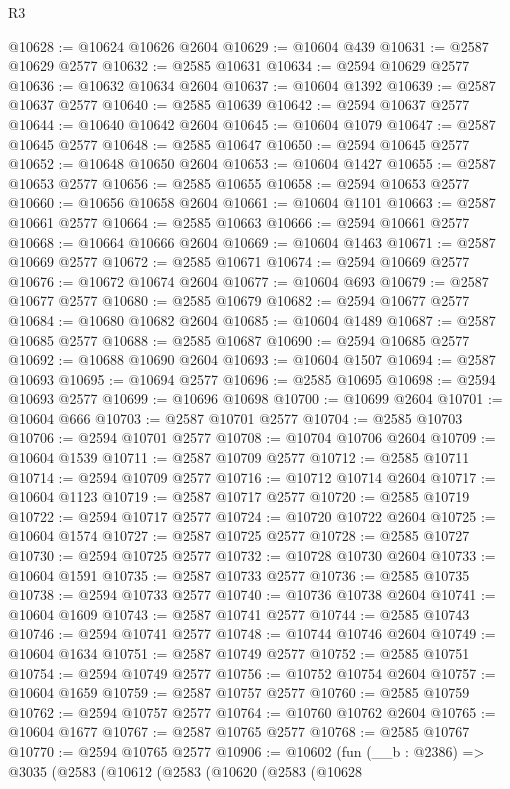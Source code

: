 \begin{lexlean}{R3}
\begin{coremodule}
@10628 := @10624 @10626 @2604
@10629 := @10604 @439
@10631 := @2587 @10629 @2577
@10632 := @2585 @10631
@10634 := @2594 @10629 @2577
@10636 := @10632 @10634 @2604
@10637 := @10604 @1392
@10639 := @2587 @10637 @2577
@10640 := @2585 @10639
@10642 := @2594 @10637 @2577
@10644 := @10640 @10642 @2604
@10645 := @10604 @1079
@10647 := @2587 @10645 @2577
@10648 := @2585 @10647
@10650 := @2594 @10645 @2577
@10652 := @10648 @10650 @2604
@10653 := @10604 @1427
@10655 := @2587 @10653 @2577
@10656 := @2585 @10655
@10658 := @2594 @10653 @2577
@10660 := @10656 @10658 @2604
@10661 := @10604 @1101
@10663 := @2587 @10661 @2577
@10664 := @2585 @10663
@10666 := @2594 @10661 @2577
@10668 := @10664 @10666 @2604
@10669 := @10604 @1463
@10671 := @2587 @10669 @2577
@10672 := @2585 @10671
@10674 := @2594 @10669 @2577
@10676 := @10672 @10674 @2604
@10677 := @10604 @693
@10679 := @2587 @10677 @2577
@10680 := @2585 @10679
@10682 := @2594 @10677 @2577
@10684 := @10680 @10682 @2604
@10685 := @10604 @1489
@10687 := @2587 @10685 @2577
@10688 := @2585 @10687
@10690 := @2594 @10685 @2577
@10692 := @10688 @10690 @2604
@10693 := @10604 @1507
@10694 := @2587 @10693
@10695 := @10694 @2577
@10696 := @2585 @10695
@10698 := @2594 @10693 @2577
@10699 := @10696 @10698
@10700 := @10699 @2604
@10701 := @10604 @666
@10703 := @2587 @10701 @2577
@10704 := @2585 @10703
@10706 := @2594 @10701 @2577
@10708 := @10704 @10706 @2604
@10709 := @10604 @1539
@10711 := @2587 @10709 @2577
@10712 := @2585 @10711
@10714 := @2594 @10709 @2577
@10716 := @10712 @10714 @2604
@10717 := @10604 @1123
@10719 := @2587 @10717 @2577
@10720 := @2585 @10719
@10722 := @2594 @10717 @2577
@10724 := @10720 @10722 @2604
@10725 := @10604 @1574
@10727 := @2587 @10725 @2577
@10728 := @2585 @10727
@10730 := @2594 @10725 @2577
@10732 := @10728 @10730 @2604
@10733 := @10604 @1591
@10735 := @2587 @10733 @2577
@10736 := @2585 @10735
@10738 := @2594 @10733 @2577
@10740 := @10736 @10738 @2604
@10741 := @10604 @1609
@10743 := @2587 @10741 @2577
@10744 := @2585 @10743
@10746 := @2594 @10741 @2577
@10748 := @10744 @10746 @2604
@10749 := @10604 @1634
@10751 := @2587 @10749 @2577
@10752 := @2585 @10751
@10754 := @2594 @10749 @2577
@10756 := @10752 @10754 @2604
@10757 := @10604 @1659
@10759 := @2587 @10757 @2577
@10760 := @2585 @10759
@10762 := @2594 @10757 @2577
@10764 := @10760 @10762 @2604
@10765 := @10604 @1677
@10767 := @2587 @10765 @2577
@10768 := @2585 @10767
@10770 := @2594 @10765 @2577
@10906 := @10602
    (fun (__b : @2386) =>
    @3035
      (@2583
        (@10612
          (@2583
            (@10620
              (@2583
                (@10628

\end{coremodule}
\end{lexlean}
